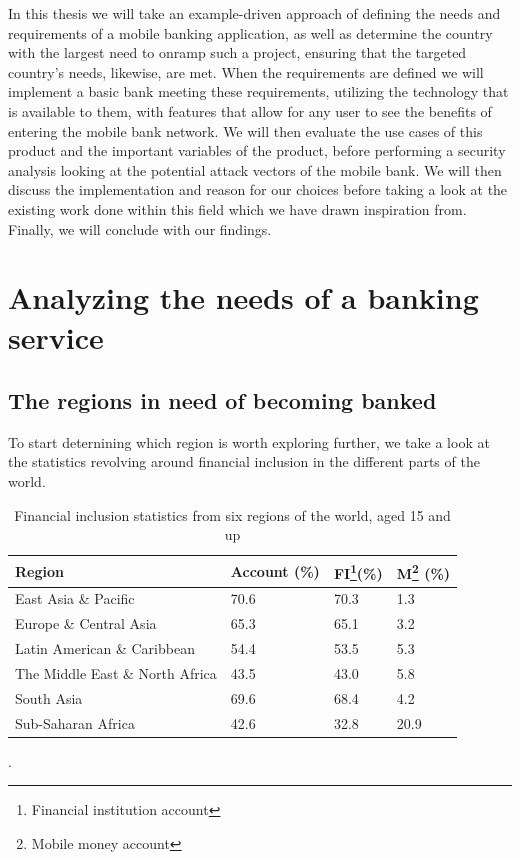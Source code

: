 \documentclass[11pt, a4paper]{article}
\begin{document}
In this thesis we will take an example-driven approach of defining the needs and requirements of a mobile banking application, as well as determine the country with the largest need to onramp such a project, ensuring that the targeted country's needs, likewise, are met. When the requirements are defined we will implement a basic bank meeting these requirements, utilizing the technology that is available to them, with features that allow for any user to see the benefits of entering the mobile bank network. We will then evaluate the use cases of this product and the important variables of the product, before performing a security analysis looking at the potential attack vectors of the mobile bank. We will then discuss the implementation and reason for our choices before taking a look at the existing work done within this field which we have drawn inspiration from. Finally, we will conclude with our findings.


\section{Analyzing the needs of a banking service}
\subsection{The regions in need of becoming banked}
To start deternining which region is worth exploring further, we take a look at the statistics revolving around financial inclusion in the different parts of the world.
\begin{table}[!ht]
\begin{tabular}{|l|l|l|l|}
\hline
\textbf{Region}       & \textbf{Account (\%)} & \textbf{FI\footnote{Financial institution account}(\%)} & \textbf{M\footnote{Mobile money account} (\%)} \\ \hline
East Asia \& Pacific    & 70.6          & 70.3           & 1.3                \\ \hline
Europe \& Central Asia    & 65.3          & 65.1           & 3.2                \\ \hline
Latin American \& Caribbean & 54.4          & 53.5           & 5.3                \\ \hline
The Middle East \& North Africa & 43.5          & 43.0           & 5.8                \\ \hline
South Asia          & 69.6          & 68.4           & 4.2                \\ \hline
Sub-Saharan Africa      & 42.6          & 32.8           & 20.9                 \\ \hline
\end{tabular}
\caption{Financial inclusion statistics from six regions of the world, aged 15 and up\cite{littledata}}.
\label{tab:financial_statistics}
\end{table}
\end{document}
